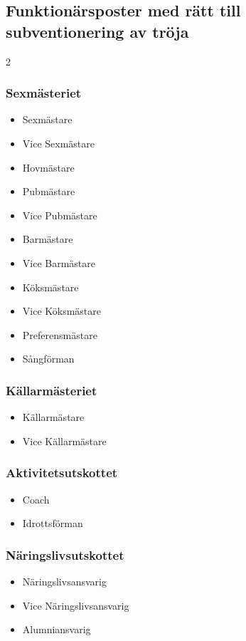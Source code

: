 \documentclass{dsekprotokoll}
\begin{document}
\subsection{Funktionärsposter med rätt till subventionering av tröja}
\begin{multicols}{2}
  \subsubsection*{Sexmästeriet}
  \begin{itemize}
    \item Sexmästare
    \item Vice Sexmästare
    \item Hovmästare
    \item Pubmästare
    \item Vice Pubmästare
    \item Barmästare
    \item Vice Barmästare
    \item Köksmästare
    \item Vice Köksmästare
    \item Preferensmästare
    \item Sångförman
  \end{itemize}

  \subsubsection*{Källarmästeriet}
  \begin{itemize}
    \item Källarmästare
    \item Vice Källarmästare
  \end{itemize}

  \subsubsection*{Aktivitetsutskottet}
  \begin{itemize}
    \item Coach
    \item Idrottsförman
  \end{itemize}
  \subsubsection*{Näringslivsutskottet}
  \begin{itemize}
    \item Näringslivsansvarig
    \item Vice Näringslivsansvarig
    \item Alumniansvarig
  \end{itemize}



\end{multicols}
\end{document}
